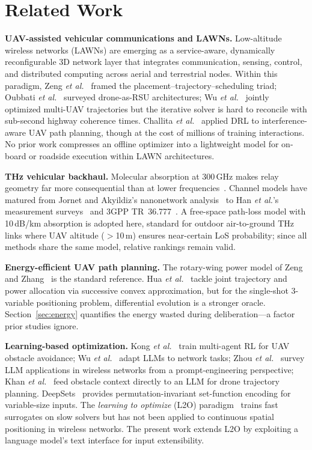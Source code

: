 \documentclass[journal]{IEEEtran}
\begin{document}
\section{Related Work}
\label{sec:related}

\textbf{UAV-assisted vehicular communications and LAWNs.}
Low-altitude wireless networks (LAWNs) are emerging as a service-aware, dynamically reconfigurable 3D network layer that integrates communication, sensing, control, and distributed computing across aerial and terrestrial nodes. Within this paradigm, Zeng \textit{et al.}~\cite{zeng2016wireless} framed the placement--trajectory--scheduling triad; Oubbati \textit{et al.}~\cite{oubbati2020} surveyed drone-as-RSU architectures; Wu \textit{et al.}~\cite{wu2018multi} jointly optimized multi-UAV trajectories but the iterative solver is hard to reconcile with sub-second highway coherence times. Challita \textit{et al.}~\cite{challita2019} applied DRL to interference-aware UAV path planning, though at the cost of millions of training interactions. No prior work compresses an offline optimizer into a lightweight model for on-board or roadside execution within LAWN architectures.

\textbf{THz vehicular backhaul.}
Molecular absorption at 300\,GHz makes relay geometry far more consequential than at lower frequencies~\cite{akyildiz2022, sarieddeen2021}. Channel models have matured from Jornet and Akyildiz's nanonetwork analysis~\cite{jornet2011} to Han \textit{et al.}'s measurement surveys~\cite{han2022} and 3GPP TR~36.777~\cite{3gpp36777}. A free-space path-loss model with 10\,dB/km absorption is adopted here, standard for outdoor air-to-ground THz links where UAV altitude ($>$10\,m) ensures near-certain LoS probability; since all methods share the same model, relative rankings remain valid.

\textbf{Energy-efficient UAV path planning.}
The rotary-wing power model of Zeng and Zhang~\cite{zeng2017energy} is the standard reference. Hua \textit{et al.}~\cite{hua2018} tackle joint trajectory and power allocation via successive convex approximation, but for the single-shot 3-variable positioning problem, differential evolution is a stronger oracle. Section~\ref{sec:energy} quantifies the energy wasted during deliberation---a factor prior studies ignore.

\textbf{Learning-based optimization.}
Kong \textit{et al.}~\cite{kong2023multi} train multi-agent RL for UAV obstacle avoidance; Wu \textit{et al.}~\cite{wu2024netllm} adapt LLMs to network tasks; Zhou \textit{et al.}~\cite{zhou2024llm} survey LLM applications in wireless networks from a prompt-engineering perspective; Khan \textit{et al.}~\cite{khan2025llmnav} feed obstacle context directly to an LLM for drone trajectory planning. DeepSets~\cite{zaheer2017deepsets} provides permutation-invariant set-function encoding for variable-size inputs. The \emph{learning to optimize} (L2O) paradigm~\cite{bengio2021} trains fast surrogates on slow solvers but has not been applied to continuous spatial positioning in wireless networks. The present work extends L2O by exploiting a language model's text interface for input extensibility.
\end{document}
